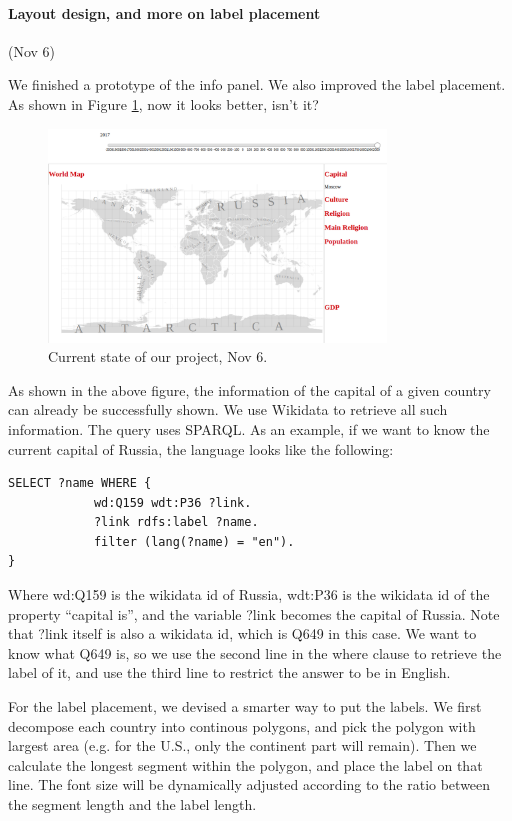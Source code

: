 \documentclass[12pt, fullpage,letterpaper]{article}
\begin{document}
\newpage
\paragraph{Layout design, and more on label placement} (Nov 6)

We finished a prototype of the info panel. We also improved the label placement.
As shown in Figure \ref{fig:nov6}, now it looks better, isn't it?

\begin{figure}[h!]
    \begin{center}
        \includegraphics[width=0.8\textwidth]{figs/Nov6.png}
        \caption{Current state of our project, Nov 6.}
        \label{fig:nov6}
    \end{center}
\end{figure}

As shown in the above figure, the information of the capital of a given country
can already be successfully shown. We use Wikidata to retrieve all such information.
The query uses SPARQL. As an example, if we want to know the current capital of Russia,
the language looks like the following:

\begin{verbatim}
SELECT ?name WHERE {
            wd:Q159 wdt:P36 ?link.
            ?link rdfs:label ?name.
            filter (lang(?name) = "en").
}
\end{verbatim}

Where wd:Q159 is the wikidata id of Russia, wdt:P36 is the wikidata id of the property ``capital is'',
and the variable ?link becomes the capital of Russia. Note that ?link itself is also a wikidata id,
which is Q649 in this case. We want to know what Q649 is, so we use the second line in the where clause to retrieve
the label of it, and use the third line to restrict the answer to be in English.

For the label placement, we devised a smarter way to put the labels. We first decompose
each country into continous polygons, and pick the polygon with largest area (e.g. for the U.S., only the continent part will remain).
Then we calculate the longest segment within the polygon, and place the label on that line.
The font size will be dynamically adjusted according to the ratio between the segment length and the label length.
\end{document}

